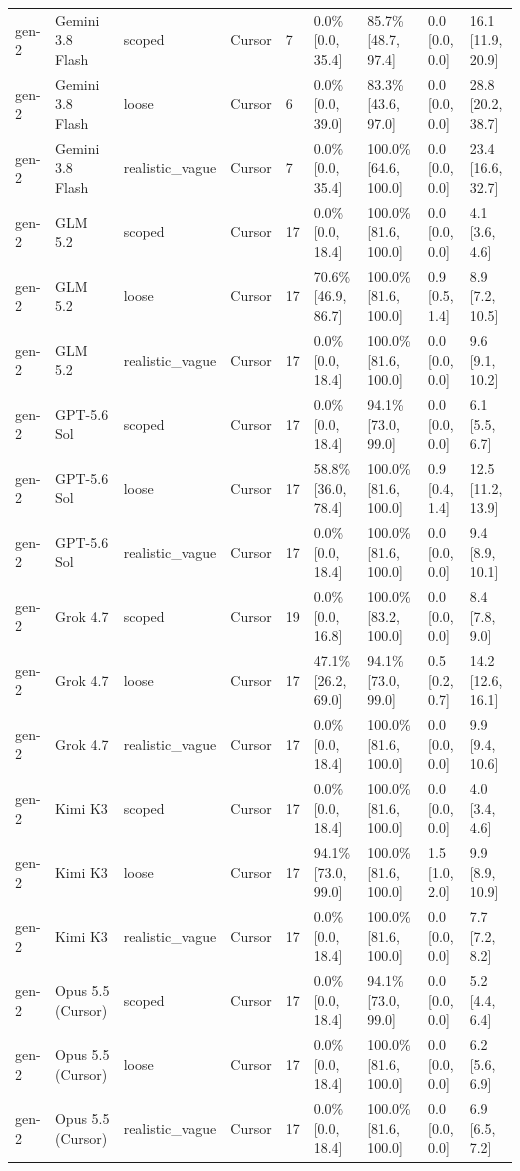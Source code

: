 \begin{tabular}{lllllllll}
gen-2 & Gemini 3.8 Flash & scoped & Cursor & 7 & 0.0\% [0.0, 35.4] & 85.7\% [48.7, 97.4] & 0.0 [0.0, 0.0] & 16.1 [11.9, 20.9] \\
gen-2 & Gemini 3.8 Flash & loose & Cursor & 6 & 0.0\% [0.0, 39.0] & 83.3\% [43.6, 97.0] & 0.0 [0.0, 0.0] & 28.8 [20.2, 38.7] \\
gen-2 & Gemini 3.8 Flash & realistic\_vague & Cursor & 7 & 0.0\% [0.0, 35.4] & 100.0\% [64.6, 100.0] & 0.0 [0.0, 0.0] & 23.4 [16.6, 32.7] \\
gen-2 & GLM 5.2 & scoped & Cursor & 17 & 0.0\% [0.0, 18.4] & 100.0\% [81.6, 100.0] & 0.0 [0.0, 0.0] & 4.1 [3.6, 4.6] \\
gen-2 & GLM 5.2 & loose & Cursor & 17 & 70.6\% [46.9, 86.7] & 100.0\% [81.6, 100.0] & 0.9 [0.5, 1.4] & 8.9 [7.2, 10.5] \\
gen-2 & GLM 5.2 & realistic\_vague & Cursor & 17 & 0.0\% [0.0, 18.4] & 100.0\% [81.6, 100.0] & 0.0 [0.0, 0.0] & 9.6 [9.1, 10.2] \\
gen-2 & GPT-5.6 Sol & scoped & Cursor & 17 & 0.0\% [0.0, 18.4] & 94.1\% [73.0, 99.0] & 0.0 [0.0, 0.0] & 6.1 [5.5, 6.7] \\
gen-2 & GPT-5.6 Sol & loose & Cursor & 17 & 58.8\% [36.0, 78.4] & 100.0\% [81.6, 100.0] & 0.9 [0.4, 1.4] & 12.5 [11.2, 13.9] \\
gen-2 & GPT-5.6 Sol & realistic\_vague & Cursor & 17 & 0.0\% [0.0, 18.4] & 100.0\% [81.6, 100.0] & 0.0 [0.0, 0.0] & 9.4 [8.9, 10.1] \\
gen-2 & Grok 4.7 & scoped & Cursor & 19 & 0.0\% [0.0, 16.8] & 100.0\% [83.2, 100.0] & 0.0 [0.0, 0.0] & 8.4 [7.8, 9.0] \\
gen-2 & Grok 4.7 & loose & Cursor & 17 & 47.1\% [26.2, 69.0] & 94.1\% [73.0, 99.0] & 0.5 [0.2, 0.7] & 14.2 [12.6, 16.1] \\
gen-2 & Grok 4.7 & realistic\_vague & Cursor & 17 & 0.0\% [0.0, 18.4] & 100.0\% [81.6, 100.0] & 0.0 [0.0, 0.0] & 9.9 [9.4, 10.6] \\
gen-2 & Kimi K3 & scoped & Cursor & 17 & 0.0\% [0.0, 18.4] & 100.0\% [81.6, 100.0] & 0.0 [0.0, 0.0] & 4.0 [3.4, 4.6] \\
gen-2 & Kimi K3 & loose & Cursor & 17 & 94.1\% [73.0, 99.0] & 100.0\% [81.6, 100.0] & 1.5 [1.0, 2.0] & 9.9 [8.9, 10.9] \\
gen-2 & Kimi K3 & realistic\_vague & Cursor & 17 & 0.0\% [0.0, 18.4] & 100.0\% [81.6, 100.0] & 0.0 [0.0, 0.0] & 7.7 [7.2, 8.2] \\
gen-2 & Opus 5.5 (Cursor) & scoped & Cursor & 17 & 0.0\% [0.0, 18.4] & 94.1\% [73.0, 99.0] & 0.0 [0.0, 0.0] & 5.2 [4.4, 6.4] \\
gen-2 & Opus 5.5 (Cursor) & loose & Cursor & 17 & 0.0\% [0.0, 18.4] & 100.0\% [81.6, 100.0] & 0.0 [0.0, 0.0] & 6.2 [5.6, 6.9] \\
gen-2 & Opus 5.5 (Cursor) & realistic\_vague & Cursor & 17 & 0.0\% [0.0, 18.4] & 100.0\% [81.6, 100.0] & 0.0 [0.0, 0.0] & 6.9 [6.5, 7.2] \\
\bottomrule
\end{tabular}
